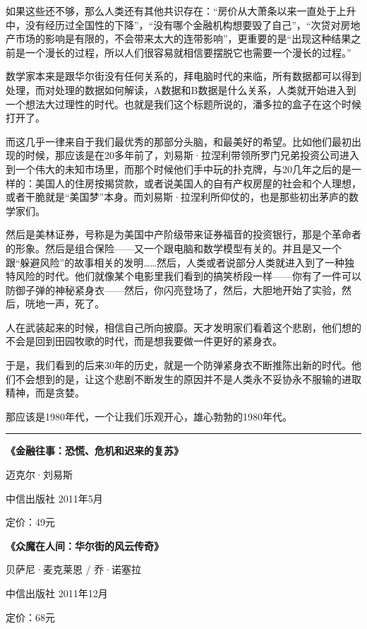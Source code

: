 如果这些还不够，那么人类还有其他共识存在：``房价从大萧条以来一直处于上升中，没有经历过全国性的下降''，``没有哪个金融机构想要毁了自己''，``次贷对房地产市场的影响是有限的，不会带来太大的连带影响''，更重要的是``出现这种结果之前是一个漫长的过程，所以人们很容易就相信要摆脱它也需要一个漫长的过程。''

数学家本来是跟华尔街没有任何关系的，拜电脑时代的来临，所有数据都可以得到处理，而对处理的数据如何解读，A数据和B数据是什么关系，人类就开始进入到一个想法大过理性的时代。也就是我们这个标题所说的，潘多拉的盒子在这个时候打开了。

而这几乎一律来自于我们最优秀的那部分头脑，和最美好的希望。比如他们最初出现的时候，那应该是在20多年前了，刘易斯·拉涅利带领所罗门兄弟投资公司进入到一个伟大的未知市场里，而那个时候他们手中玩的扑克牌，与20几年之后的是一样的：美国人的住房按揭贷款，或者说美国人的自有产权房屋的社会和个人理想，或者干脆就是``美国梦''本身。而刘易斯·拉涅利所仰仗的，也是那些初出茅庐的数学家们。

然后是美林证券，号称是为美国中产阶级带来证券福音的投资银行，那是个革命者的形象。然后是组合保险------又一个跟电脑和数学模型有关的。并且是又一个跟``躲避风险''的故事相关的发明\ldots{}\ldots{}然后，人类或者说部分人类就进入到了一种独特风险的时代。他们就像某个电影里我们看到的搞笑桥段一样------你有了一件可以防御子弹的神秘紧身衣------然后，你闪亮登场了，然后，大胆地开始了实验，然后，咣地一声，死了。

人在武装起来的时候，相信自己所向披靡。天才发明家们看着这个悲剧，他们想的不会是回到田园牧歌的时代，而是想我要做一件更好的紧身衣。

于是，我们看到的后来30年的历史，就是一个防弹紧身衣不断推陈出新的时代。他们不会想到的是，让这个悲剧不断发生的原因并不是人类永不妥协永不服输的进取精神，而是贪婪。

那应该是1980年代，一个让我们乐观开心，雄心勃勃的1980年代。

\begin{center}\rule{3in}{0.4pt}\end{center}

\textbf{《金融往事：恐慌、危机和迟来的复苏》}

迈克尔·刘易斯

中信出版社 2011年5月

定价：49元

\textbf{《众魔在人间：华尔街的风云传奇》}

贝萨尼·麦克莱恩 / 乔·诺塞拉

中信出版社 2011年12月

定价：68元

